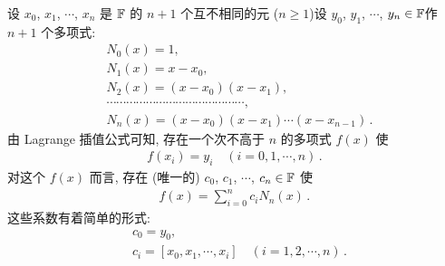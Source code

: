 \begin{proposition}
    设 $x_0$, $x_1$, $\cdots$, $x_{n}$ 是 $\mathbb{F}$ 的 $n+1$ 个互不相同的元 ($n \geq 1$)\period 设 $y_0$, $y_1$, $\cdots$, $y_{n} \in \mathbb{F}$\period 作 $n+1$ 个多项式:
    \begin{align*}
         & N_0 (x) = 1,                                                 \\
         & N_1 (x) = x - x_0,                                           \\
         & N_2 (x) = (x - x_0) (x - x_1),                               \\
         & \cdots \cdots \cdots \cdots \cdots \cdots \cdots
        \cdots \cdots \cdots \cdots \cdots \cdots \cdots,               \\
         & N_{n} (x) = (x - x_0) (x - x_1) \cdots (x - x_{n-1}) \period
    \end{align*}
    由 Lagrange 插值公式可知, 存在一个次不高于 $n$ 的多项式 $f(x)$ 使
    \begin{align*}
        f(x_i) = y_i \quad (i = 0,1,\cdots,n) \period
    \end{align*}
    对这个 $f(x)$ 而言, 存在 (唯一的) $c_0$, $c_1$, $\cdots$, $c_n \in \mathbb{F}$ 使
    \begin{align*}
        f(x) = \sum_{i = 0}^{n} c_i N_{n} (x) \period
    \end{align*}
    这些系数有着简单的形式:
    \begin{align*}
         & c_0 = y_0,                                                     \\
         & c_i = [x_0, x_1, \cdots, x_i] \quad (i = 1,2,\cdots,n) \period
    \end{align*}
\end{proposition}

